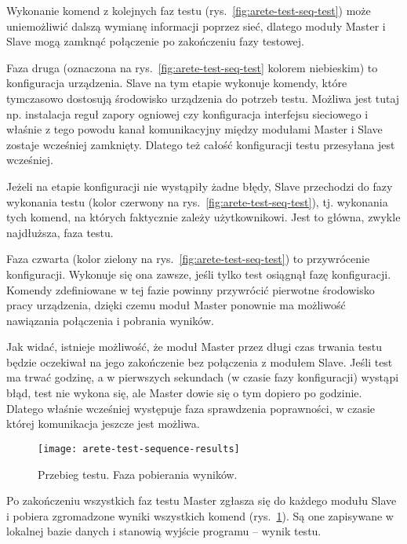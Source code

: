 \documentclass[00-praca-magisterska.tex]{subfiles}
\begin{document}
Wykonanie komend z kolejnych faz testu (rys.~\ref{fig:arete-test-seq-test})
może uniemożliwić dalszą wymianę informacji poprzez sieć, dlatego moduły Master
i Slave mogą zamknąć połączenie po zakończeniu fazy testowej.

Faza druga (oznaczona na rys.~\ref{fig:arete-test-seq-test} kolorem niebieskim)
to konfiguracja urządzenia. Slave na tym etapie wykonuje komendy, które
tymczasowo dostosują środowisko urządzenia do potrzeb testu. Możliwa jest tutaj
np. instalacja reguł zapory ogniowej czy konfiguracja interfejsu sieciowego i
właśnie z tego powodu kanał komunikacyjny między modułami Master i Slave
zostaje wcześniej zamknięty. Dlatego też całość konfiguracji testu przesyłana
jest wcześniej.

Jeżeli na etapie konfiguracji nie wystąpiły żadne błędy, Slave przechodzi do
fazy wykonania testu (kolor czerwony na rys.~\ref{fig:arete-test-seq-test}), tj.
wykonania tych komend, na których faktycznie zależy użytkownikowi. Jest to
główna, zwykle najdłuższa, faza testu.

Faza czwarta (kolor zielony na rys.~\ref{fig:arete-test-seq-test}) to
przywrócenie konfiguracji. Wykonuje się ona zawsze, jeśli tylko test osiągnął
fazę konfiguracji. Komendy zdefiniowane w tej fazie powinny przywrócić
pierwotne środowisko pracy urządzenia, dzięki czemu moduł Master ponownie ma
możliwość nawiązania połączenia i pobrania wyników.

Jak widać, istnieje możliwość, że moduł Master przez długi czas trwania testu
będzie oczekiwał na jego zakończenie bez połączenia z modułem Slave. Jeśli test
ma trwać godzinę, a w pierwszych sekundach (w czasie fazy konfiguracji) wystąpi
błąd, test nie wykona się, ale Master dowie się o tym dopiero po godzinie.
Dlatego właśnie wcześniej występuje faza sprawdzenia poprawności, w czasie
której komunikacja jeszcze jest możliwa.

\begin{figure}
\begin{center}
\leavevmode
\texttt{[image: arete-test-sequence-results]}
\end{center}
\caption{Przebieg testu. Faza pobierania wyników.}
\label{fig:arete-test-seq-results}
\end{figure}

Po zakończeniu wszystkich faz testu Master zgłasza się do każdego modułu Slave
i pobiera zgromadzone wyniki wszystkich komend
(rys.~\ref{fig:arete-test-seq-results}). Są one zapisywane w lokalnej bazie
danych i stanowią wyjście programu -- wynik testu.
\end{document}
